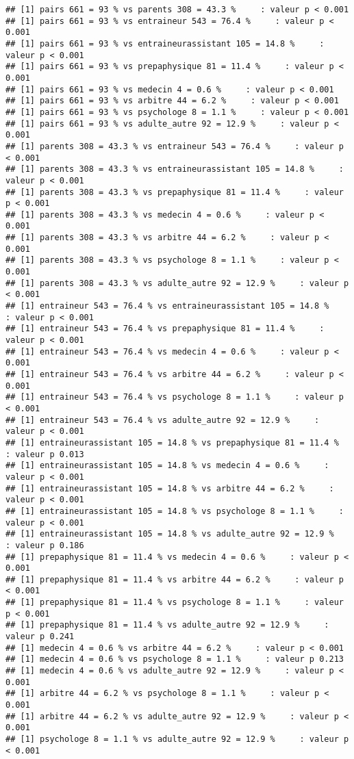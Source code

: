 \documentclass[
]{article}
\begin{document}
\begin{verbatim}
## [1] pairs 661 = 93 % vs parents 308 = 43.3 %     : valeur p < 0.001
## [1] pairs 661 = 93 % vs entraineur 543 = 76.4 %     : valeur p < 0.001
## [1] pairs 661 = 93 % vs entraineurassistant 105 = 14.8 %     : valeur p < 0.001
## [1] pairs 661 = 93 % vs prepaphysique 81 = 11.4 %     : valeur p < 0.001
## [1] pairs 661 = 93 % vs medecin 4 = 0.6 %     : valeur p < 0.001
## [1] pairs 661 = 93 % vs arbitre 44 = 6.2 %     : valeur p < 0.001
## [1] pairs 661 = 93 % vs psychologe 8 = 1.1 %     : valeur p < 0.001
## [1] pairs 661 = 93 % vs adulte_autre 92 = 12.9 %     : valeur p < 0.001
## [1] parents 308 = 43.3 % vs entraineur 543 = 76.4 %     : valeur p < 0.001
## [1] parents 308 = 43.3 % vs entraineurassistant 105 = 14.8 %     : valeur p < 0.001
## [1] parents 308 = 43.3 % vs prepaphysique 81 = 11.4 %     : valeur p < 0.001
## [1] parents 308 = 43.3 % vs medecin 4 = 0.6 %     : valeur p < 0.001
## [1] parents 308 = 43.3 % vs arbitre 44 = 6.2 %     : valeur p < 0.001
## [1] parents 308 = 43.3 % vs psychologe 8 = 1.1 %     : valeur p < 0.001
## [1] parents 308 = 43.3 % vs adulte_autre 92 = 12.9 %     : valeur p < 0.001
## [1] entraineur 543 = 76.4 % vs entraineurassistant 105 = 14.8 %     : valeur p < 0.001
## [1] entraineur 543 = 76.4 % vs prepaphysique 81 = 11.4 %     : valeur p < 0.001
## [1] entraineur 543 = 76.4 % vs medecin 4 = 0.6 %     : valeur p < 0.001
## [1] entraineur 543 = 76.4 % vs arbitre 44 = 6.2 %     : valeur p < 0.001
## [1] entraineur 543 = 76.4 % vs psychologe 8 = 1.1 %     : valeur p < 0.001
## [1] entraineur 543 = 76.4 % vs adulte_autre 92 = 12.9 %     : valeur p < 0.001
## [1] entraineurassistant 105 = 14.8 % vs prepaphysique 81 = 11.4 %     : valeur p 0.013
## [1] entraineurassistant 105 = 14.8 % vs medecin 4 = 0.6 %     : valeur p < 0.001
## [1] entraineurassistant 105 = 14.8 % vs arbitre 44 = 6.2 %     : valeur p < 0.001
## [1] entraineurassistant 105 = 14.8 % vs psychologe 8 = 1.1 %     : valeur p < 0.001
## [1] entraineurassistant 105 = 14.8 % vs adulte_autre 92 = 12.9 %     : valeur p 0.186
## [1] prepaphysique 81 = 11.4 % vs medecin 4 = 0.6 %     : valeur p < 0.001
## [1] prepaphysique 81 = 11.4 % vs arbitre 44 = 6.2 %     : valeur p < 0.001
## [1] prepaphysique 81 = 11.4 % vs psychologe 8 = 1.1 %     : valeur p < 0.001
## [1] prepaphysique 81 = 11.4 % vs adulte_autre 92 = 12.9 %     : valeur p 0.241
## [1] medecin 4 = 0.6 % vs arbitre 44 = 6.2 %     : valeur p < 0.001
## [1] medecin 4 = 0.6 % vs psychologe 8 = 1.1 %     : valeur p 0.213
## [1] medecin 4 = 0.6 % vs adulte_autre 92 = 12.9 %     : valeur p < 0.001
## [1] arbitre 44 = 6.2 % vs psychologe 8 = 1.1 %     : valeur p < 0.001
## [1] arbitre 44 = 6.2 % vs adulte_autre 92 = 12.9 %     : valeur p < 0.001
## [1] psychologe 8 = 1.1 % vs adulte_autre 92 = 12.9 %     : valeur p < 0.001
\end{verbatim}
\end{document}
